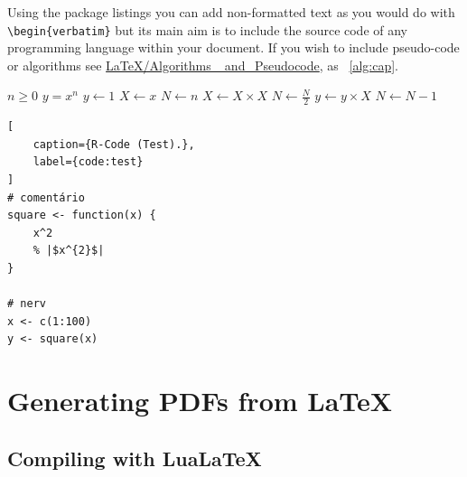 Using the package listings you can add non-formatted text as you would do with \verb|\begin{verbatim}| but its main aim is to include the source code of any programming language within your document. If you wish to include pseudo-code or algorithms see \href{http://en.wikibooks.org/wiki/LaTeX/Algorithms_and_Pseudocode}{LaTeX/Algorithms\_ and\_Pseudocode}, as \algorithmname~\ref{alg:cap}.


\begin{algorithm}
\caption{An algorithm with caption}\label{alg:cap}
\begin{algorithmic}
\Require $n \geq 0$
\Ensure $y = x^n$
\State $y \gets 1$
\State $X \gets x$
\State $N \gets n$
    \State $X \gets X \times X$
    \State $N \gets \frac{N}{2}$  
    \State $y \gets y \times X$
    \State $N \gets N - 1$
\EndIf
\EndWhile
\end{algorithmic}
\end{algorithm}

\lstset{language=R, numbers=left}
\begin{lstlisting}[
    caption={R-Code (Test).},
    label={code:test}
]
# comentário
square <- function(x) {
    x^2
    % |$x^{2}$|
}

# nerv
x <- c(1:100)
y <- square(x)
\end{lstlisting}


\section{Generating PDFs from \LaTeX} %
\label{sec:generating_pdfs_from_latex}

\subsection{Compiling with LuaLaTeX} %
\label{ssec:compiling_with_lualatex}

\noindent%
\medskip


